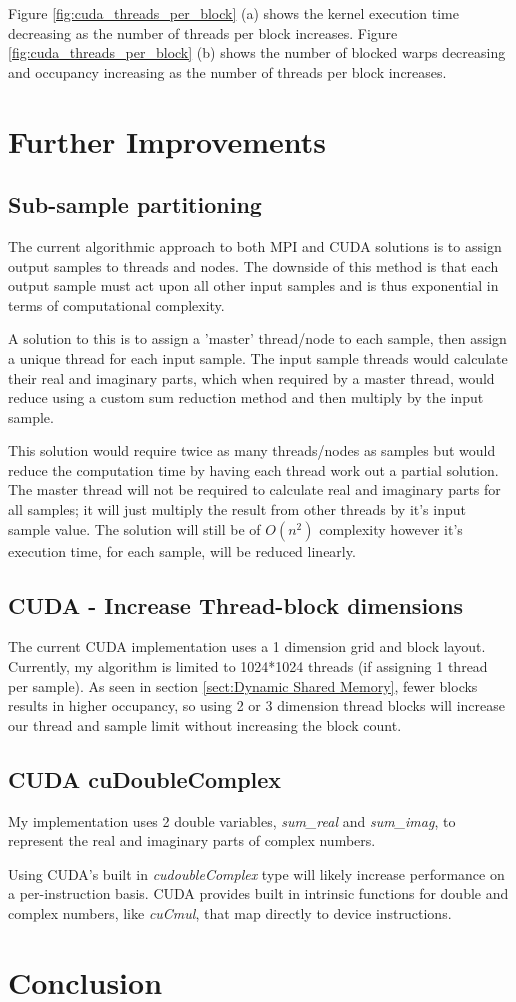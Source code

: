 \documentclass[11pt,a4paper]{article}
\begin{document}
Figure \ref{fig:cuda_threads_per_block} (a) shows the kernel execution time decreasing as the number of threads per block increases. Figure \ref{fig:cuda_threads_per_block} (b) shows the number of blocked warps decreasing and occupancy increasing as the number of threads per block increases.

\section{Further Improvements}
\subsection{Sub-sample partitioning}
The current algorithmic approach to both MPI and CUDA solutions is to assign output samples to threads and nodes. The downside of this method is that each output sample must act upon all other input samples and is thus exponential in terms of computational complexity.

A solution to this is to assign a 'master' thread/node to each sample, then assign a unique thread for each input sample. The input sample threads would calculate their real and imaginary parts, which when required by a master thread, would reduce using a custom sum reduction method and then multiply by the input sample.

This solution would require twice as many threads/nodes as samples but would reduce the computation time by having each thread work out a partial solution. The master thread will not be required to calculate real and imaginary parts for all samples; it will just multiply the result from other threads by it's input sample value. The solution will still be of $O(n^2)$ complexity however it's execution time, for each sample, will be reduced linearly.

\subsection{CUDA - Increase Thread-block dimensions}
The current CUDA implementation uses a 1 dimension grid and block layout. Currently, my algorithm is limited to 1024*1024 threads (if assigning 1 thread per sample). As seen in section \ref{sect:Dynamic Shared Memory}, fewer blocks results in higher occupancy, so using 2 or 3 dimension thread blocks will increase our thread and sample limit without increasing the block count. 

\subsection{CUDA cuDoubleComplex}
My implementation uses 2 double variables, \textit{sum\_real} and \textit{sum\_imag}, to represent the real and imaginary parts of complex numbers.

Using CUDA's built in \textit{cudoubleComplex} type will likely increase performance on a per-instruction basis. CUDA provides built in intrinsic functions for double and complex numbers, like \textit{cuCmul}, that map directly to device instructions.

\newpage
\section{Conclusion}
\end{document}
